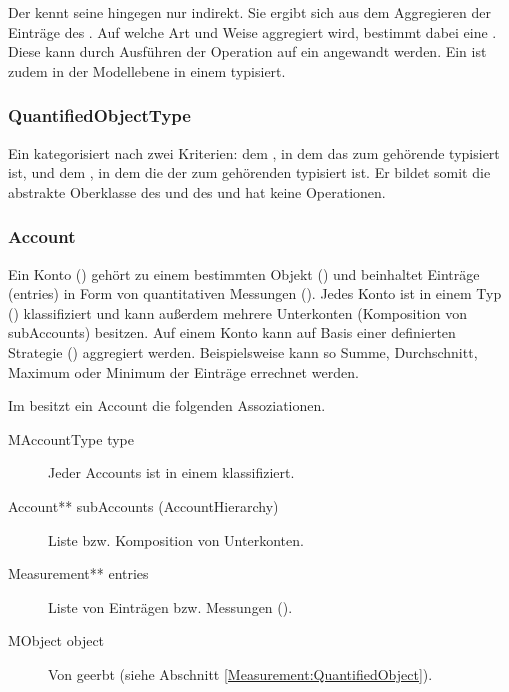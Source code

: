 Der  kennt seine  hingegen nur indirekt. Sie ergibt sich aus dem Aggregieren der Einträge
 des . Auf welche Art und Weise aggregiert wird, bestimmt dabei eine
. Diese kann durch Ausführen der Operation  auf ein 
angewandt werden. Ein  ist zudem in der Modellebene in einem  typisiert.


\subsubsection{QuantifiedObjectType}
Ein  kategorisiert  nach zwei Kriterien: dem , in dem das
zum  gehörende  typisiert ist, und dem , in dem die 
der zum  gehörenden  typisiert ist. Er bildet somit die abstrakte Oberklasse des
 und des  und hat keine Operationen.


\subsubsection{Account}
Ein Konto () gehört zu einem bestimmten Objekt () und beinhaltet Einträge (entries) in Form von quantitativen Messungen (). 
Jedes Konto ist in einem Typ () klassifiziert und kann außerdem mehrere Unterkonten (Komposition von subAccounts) besitzen.
Auf einem Konto kann auf Basis einer definierten Strategie () aggregiert werden. 
Beispielsweise kann so Summe, Durchschnitt, Maximum oder Minimum der Einträge errechnet werden. 

Im \MM besitzt ein Account die folgenden Assoziationen.
\begin{description}
	\item[MAccountType type] Jeder Accounts ist in einem  klassifiziert.
	\item[Account** subAccounts (AccountHierarchy)] Liste bzw. Komposition von Unterkonten.
	\item[Measurement** entries] Liste von Einträgen bzw. Messungen ().
	\item[MObject object] Von  geerbt (siehe Abschnitt \ref{Measurement:QuantifiedObject}).
\end{description}

